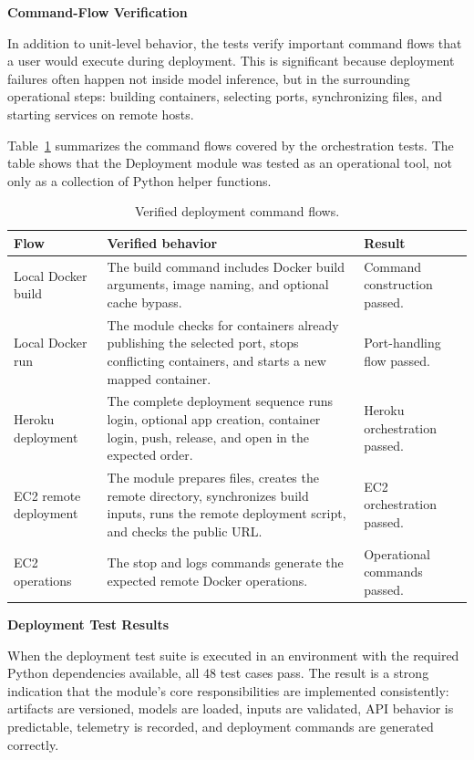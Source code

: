 \medskip
\noindent\textbf{Command-Flow Verification}\par\smallskip
\noindent In addition to unit-level behavior, the tests verify important
command flows that a user would execute during deployment. This is significant
because deployment failures often happen not inside model inference, but in the
surrounding operational steps: building containers, selecting ports,
synchronizing files, and starting services on remote hosts.

Table~\ref{tab:deployment_command_flow_results} summarizes the command flows
covered by the orchestration tests. The table shows that the Deployment module
was tested as an operational tool, not only as a collection of Python helper
functions.

\begin{table}[H]
\centering
\acceleraTableStyle
\caption{Verified deployment command flows.}
\label{tab:deployment_command_flow_results}
\begin{tabularx}{\textwidth}{p{}X X}
\toprule
\textbf{Flow} & \textbf{Verified behavior} & \textbf{Result} \\
\midrule
Local Docker build &
The build command includes Docker build arguments, image naming, and optional
cache bypass. &
Command construction passed. \\
\midrule
Local Docker run &
The module checks for containers already publishing the selected port, stops
conflicting containers, and starts a new mapped container. &
Port-handling flow passed. \\
\midrule
Heroku deployment &
The complete deployment sequence runs login, optional app creation, container
login, push, release, and open in the expected order. &
Heroku orchestration passed. \\
\midrule
EC2 remote deployment &
The module prepares files, creates the remote directory, synchronizes build
inputs, runs the remote deployment script, and checks the public URL. &
EC2 orchestration passed. \\
\midrule
EC2 operations &
The stop and logs commands generate the expected remote Docker operations. &
Operational commands passed. \\
\bottomrule
\end{tabularx}
\end{table}

\medskip
\noindent\textbf{Deployment Test Results}\par\smallskip
\noindent When the deployment test suite is executed in an environment with the
required Python dependencies available, all 48 test cases pass. The result is a
strong indication that the module's core responsibilities are implemented
consistently: artifacts are versioned, models are loaded, inputs are validated,
API behavior is predictable, telemetry is recorded, and deployment commands are
generated correctly.

